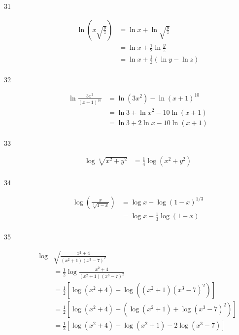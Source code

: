 \documentclass{exam}
\begin{document}
\begin{description}
      \item[31] 
        \begin{align*}
          \ln \left( x \sqrt{ \frac{y}{z}} \right) &= \ln x + \ln \sqrt{ \frac{y}{z}} \\
                                                   &= \ln x + \frac{1}{2} \ln \frac{y}{z} \\
                                                   &= \boxed{\ln x + \frac{1}{2} (\ln y - \ln z)} \\
        \end{align*}

      \item[32] 
        \begin{align*}
          \ln \frac{3x^2}{(x + 1)^{10}} &= \ln \left( 3x^2 \right) - \ln (x + 1)^{10} \\
                                        &= \ln 3 + \ln x^2 - 10 \ln (x + 1) \\
                                        &= \boxed{\ln 3 + 2 \ln x - 10 \ln (x + 1)} \\
        \end{align*}

      \item[33] 
        \begin{align*}
          \log \sqrt[4]{x^2 + y^2} &= \boxed{\frac{1}{4} \log \left( x^2 + y^2 \right)} \\
        \end{align*}

      \item[34] 
        \begin{align*}
          \log \left( \frac{x} {\sqrt[3]{1 - x}} \right) &= \log x - \log (1 - x)^{1/3} \\
                                                         &= \boxed{\log x - \frac{1}{3} \log (1 - x)} \\
        \end{align*}

      \item[35] 
        \begin{align*}
          \log & \sqrt{ \frac{x^2 + 4}{( x^2 + 1 ) ( x^3 - 7 )^2}}  \\
               &= \frac{1}{2} \log \frac{x^2 + 4}{( x^2 + 1 ) ( x^3 - 7 )^2} \\
               &= \frac{1}{2} \left[ \log ( x^2 + 4 ) - \log (  ( x^2 + 1 ) ( x^3 - 7 )^2 ) \right] \\
               &= \frac{1}{2} \left[ \log ( x^2 + 4 ) - (\log ( x^2 + 1 ) + \log ( x^3 - 7 )^2 ) \right]  \\
               &= \boxed{\frac{1}{2} \left[ \log ( x^2 + 4 ) - \log ( x^2 + 1 ) - 2 \log ( x^3 - 7 ) \right]} \\
        \end{align*}


\end{description}
\end{document}
